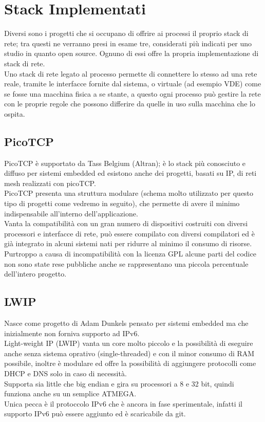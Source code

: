 \section{Stack Implementati}
Diversi sono i progetti che si occupano di offrire ai processi il proprio stack di rete; tra questi ne verranno presi in esame tre, considerati pi\`u indicati per uno studio in quanto open source. Ognuno di essi offre la propria implementazione di stack di rete.\\
Uno stack di rete legato al processo permette di connettere lo stesso ad una rete reale, tramite le interfacce fornite dal sistema, o virtuale (ad esempio VDE) come se fosse una macchina fisica a se stante, a questo ogni processo pu\`o gestire la rete con le proprie regole che possono differire da quelle in uso sulla macchina che lo ospita.

\subsection{PicoTCP}
PicoTCP\cite{K4} \`e supportato da Tass Belgium (Altran); \`e lo stack pi\`u conosciuto e diffuso per sistemi embedded ed esistono anche dei progetti, basati su IP, di reti mesh realizzati con picoTCP\cite{K14}.\\
PicoTCP presenta una struttura modulare (schema molto utilizzato per questo tipo di progetti come vedremo in seguito), che permette di avere il minimo indispensabile all'interno dell'applicazione.\\
Vanta la compatibilit\`a con un gran numero di dispositivi costruiti con diversi processori e interfacce di rete, pu\`o essere compilato con diversi compilatori ed \`e gi\`a integrato in alcuni sistemi nati per ridurre al minimo il consumo di risorse.\\
Purtroppo a causa di incompatibilit\`a con la licenza GPL alcune parti del codice non sono state rese pubbliche anche se rappresentano una piccola percentuale dell'intero progetto.
\subsection{LWIP}
Nasce come progetto di Adam Dunkels pensato per sistemi embedded ma che inizialmente non forniva supporto ad IPv6.\\
Light-weight IP (LWIP\cite{K13}) vanta un core molto piccolo e la possibilit\`a di eseguire anche senza sistema oprativo (single-threaded) e con il minor consumo di RAM possibile, inoltre \`e modulare ed offre la possibilit\`a di aggiungere protocolli come DHCP e DNS solo in caso di necessit\`a.\\
Supporta sia little che big endian e gira su processori a 8 e 32 bit, quindi funziona anche su un semplice ATMEGA.\\
Unica pecca \`e il protoccolo IPv6 che \`e ancora in fase sperimentale, infatti il supporto IPv6 pu\`o essere aggiunto ed \`e scaricabile da git.

